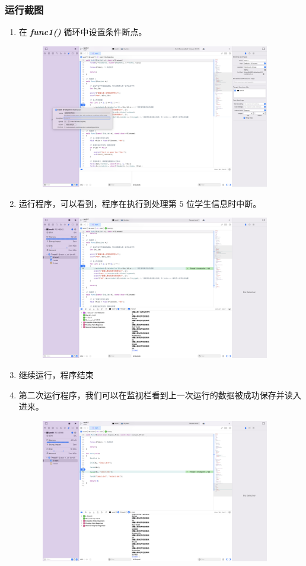         \subsubsection{运行截图}
            \begin{enumerate}
                \item 在 \textbf{\textit{func1()}} 循环中设置条件断点。
                \begin{figure}[htbp]
                    \centering
                    \includegraphics*[width = 10cm]{work1_s7.png}
                \end{figure}
                \item 运行程序，可以看到，程序在执行到处理第 $5$ 位学生信息时中断。
                \begin{figure}[htbp]
                    \centering
                    \includegraphics*[width = 10cm]{work1_s8.png}
                \end{figure}
                \item 继续运行，程序结束
                \newpage
                \item 第二次运行程序，我们可以在监视栏看到上一次运行的数据被成功保存并读入进来。
                \begin{figure}[htbp]
                    \centering
                    \includegraphics*[width = 10cm]{work1_s9.png}

\end{figure}
\end{enumerate}
